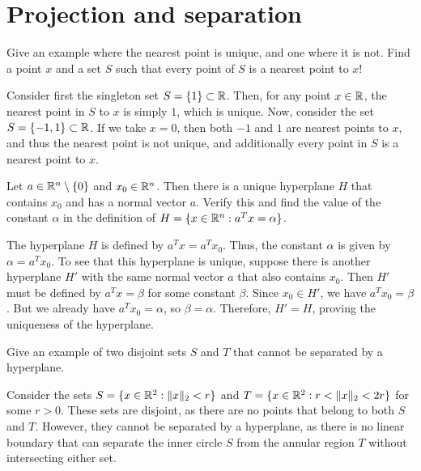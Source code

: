 \section{Projection and separation}

\begin{exercise}
  Give an example where the nearest point is unique, and one where it is not.
  Find a point $x$ and a set $S$ such that every point of $S$ is a nearest point to $x$!
\end{exercise}

\begin{solution}
  Consider first the singleton set $S = \{ 1 \} \subset \mathbb{R}$.
  Then, for any point $x \in \mathbb{R}$, the nearest point in $S$ to $x$ is simply $1$, which is unique.
  Now, consider the set $S = \{ -1, 1 \} \subset \mathbb{R}$.
  If we take $x = 0$, then both $-1$ and $1$ are nearest points to $x$, and thus the nearest point is not unique, and additionally every point in $S$ is a nearest point to $x$.
\end{solution}

\begin{exercise}
  Let $a \in \mathbb{R}^n \setminus \{0\}$ and $x_0 \in \mathbb{R}^n$.
  Then there is a unique hyperplane $H$ that contains $x_0$ and has a normal vector $a$.
  Verify this and find the value of the constant $\alpha$ in the definition of $H = \{ x \in \mathbb{R}^n : a^T x = \alpha \}$.
\end{exercise}

\begin{solution}
  The hyperplane $H$ is defined by $a^T x = a^T x_0$.
  Thus, the constant $\alpha$ is given by $\alpha = a^T x_0$.
  To see that this hyperplane is unique, suppose there is another hyperplane $H'$ with the same normal vector $a$ that also contains $x_0$.
  Then $H'$ must be defined by $a^T x = \beta$ for some constant $\beta$.
  Since $x_0 \in H'$, we have $a^T x_0 = \beta$.
  But we already have $a^T x_0 = \alpha$, so $\beta = \alpha$.
  Therefore, $H' = H$, proving the uniqueness of the hyperplane.
\end{solution}

\begin{exercise}
  Give an example of two disjoint sets $S$ and $T$ that cannot be separated by a hyperplane.
\end{exercise}

\begin{solution}
  Consider the sets $S = \{ x \in \mathbb{R}^2 : \lVert x\rVert_2 < r \}$ and $T = \{ x \in \mathbb{R}^2 : r < \lVert x\rVert_2 < 2r \}$ for some $r > 0$.
  These sets are disjoint, as there are no points that belong to both $S$ and $T$.
  However, they cannot be separated by a hyperplane, as there is no linear boundary that can separate the inner circle $S$ from the annular region $T$ without intersecting either set.
\end{solution}

